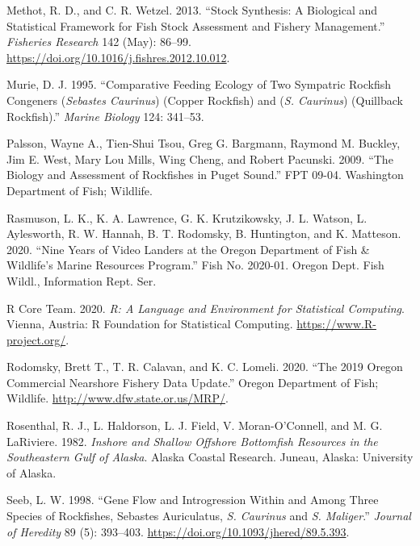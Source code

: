 \documentclass[11pt,
  english,
  a4paper,
]{article}
\begin{document}
\leavevmode\hypertarget{ref-methot_stock_2013}{}%
Methot, R. D., and C. R. Wetzel. 2013. ``Stock Synthesis: A Biological and Statistical Framework for Fish Stock Assessment and Fishery Management.'' \emph{Fisheries Research} 142 (May): 86--99. \url{https://doi.org/10.1016/j.fishres.2012.10.012}.

\leavevmode\hypertarget{ref-Murie_diet_1995}{}%
Murie, D. J. 1995. ``Comparative Feeding Ecology of Two Sympatric Rockfish Congeners (\emph{Sebastes Caurinus}) (Copper Rockfish) and (\emph{S. Caurinus}) (Quillback Rockfish).'' \emph{Marine Biology} 124: 341--53.

\leavevmode\hypertarget{ref-Palssonetal_2009}{}%
Palsson, Wayne A., Tien-Shui Tsou, Greg G. Bargmann, Raymond M. Buckley, Jim E. West, Mary Lou Mills, Wing Cheng, and Robert Pacunski. 2009. ``The Biology and Assessment of Rockfishes in Puget Sound.'' FPT 09-04. Washington Department of Fish; Wildlife.

\leavevmode\hypertarget{ref-rasmuson_lander_2020}{}%
Rasmuson, L. K., K. A. Lawrence, G. K. Krutzikowsky, J. L. Watson, L. Aylesworth, R. W. Hannah, B. T. Rodomsky, B. Huntington, and K. Matteson. 2020. ``Nine Years of Video Landers at the Oregon Department of Fish \& Wildlife's Marine Resources Program.'' Fish No. 2020-01. Oregon Dept. Fish Wildl., Information Rept. Ser.

\leavevmode\hypertarget{ref-R_2020}{}%
R Core Team. 2020. \emph{R: A Language and Environment for Statistical Computing}. Vienna, Austria: R Foundation for Statistical Computing. \url{https://www.R-project.org/}.

\leavevmode\hypertarget{ref-rodomsky_2019_2020}{}%
Rodomsky, Brett T., T. R. Calavan, and K. C. Lomeli. 2020. ``The 2019 Oregon Commercial Nearshore Fishery Data Update.'' Oregon Department of Fish; Wildlife. \url{http://www.dfw.state.or.us/MRP/}.

\leavevmode\hypertarget{ref-Rosenthaletal_maturity_1982}{}%
Rosenthal, R. J., L. Haldorson, L. J. Field, V. Moran-O'Connell, and M. G. LaRiviere. 1982. \emph{Inshore and Shallow Offshore Bottomfish Resources in the Southeastern Gulf of Alaska}. Alaska Coastal Research. Juneau, Alaska: University of Alaska.

\leavevmode\hypertarget{ref-seeb_gene_1998}{}%
Seeb, L. W. 1998. ``Gene Flow and Introgression Within and Among Three Species of Rockfishes, Sebastes Auriculatus, \emph{S. Caurinus} and \emph{S. Maliger}.'' \emph{Journal of Heredity} 89 (5): 393--403. \url{https://doi.org/10.1093/jhered/89.5.393}.
\end{document}
